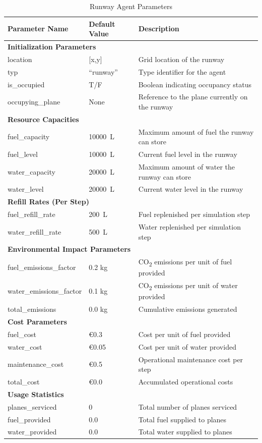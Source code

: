 \documentclass[11pt, a4paper]{article}
\begin{document}
\begin{table}[htbp]
\centering
\caption{Runway Agent Parameters}
\label{tab:runway_parameters}
\small
\begin{tabular}{@{}p{4cm}p{2cm}p{6cm}@{}}
\toprule
\textbf{Parameter Name} & \textbf{Default Value} & \textbf{Description} \\
\midrule
\multicolumn{3}{l}{\textbf{Initialization Parameters}} \\
\midrule
location & [x,y] & Grid location of the runway \\
typ & ``runway'' & Type identifier for the agent \\
is\_occupied & T/F & Boolean indicating occupancy status \\
occupying\_plane & None & Reference to the plane currently on the runway \\
\midrule
\multicolumn{3}{l}{\textbf{Resource Capacities}} \\
\midrule
fuel\_capacity & \SI{10000}{\liter} & Maximum amount of fuel the runway can store \\
fuel\_level & \SI{10000}{\liter} & Current fuel level in the runway \\
water\_capacity & \SI{20000}{\liter} & Maximum amount of water the runway can store \\
water\_level & \SI{20000}{\liter} & Current water level in the runway \\
\midrule
\multicolumn{3}{l}{\textbf{Refill Rates (Per Step)}} \\
\midrule
fuel\_refill\_rate & \SI{200}{\liter} & Fuel replenished per simulation step \\
water\_refill\_rate & \SI{500}{\liter} & Water replenished per simulation step \\
\midrule
\multicolumn{3}{l}{\textbf{Environmental Impact Parameters}} \\
\midrule
fuel\_emissions\_factor & 0.2 kg & CO\textsubscript{2} emissions per unit of fuel provided \\
water\_emissions\_factor & 0.1 kg & CO\textsubscript{2} emissions per unit of water provided \\
total\_emissions & 0.0 kg & Cumulative emissions generated \\
\midrule
\multicolumn{3}{l}{\textbf{Cost Parameters}} \\
\midrule
fuel\_cost & €0.3 & Cost per unit of fuel provided \\
water\_cost & €0.05 & Cost per unit of water provided \\
maintenance\_cost & €0.5 & Operational maintenance cost per step \\
total\_cost & €0.0 & Accumulated operational costs \\
\midrule
\multicolumn{3}{l}{\textbf{Usage Statistics}} \\
\midrule
planes\_serviced & 0 & Total number of planes serviced \\
fuel\_provided & 0.0 & Total fuel supplied to planes \\
water\_provided & 0.0 & Total water supplied to planes \\
\bottomrule
\end{tabular}
\end{table}


\end{document}
